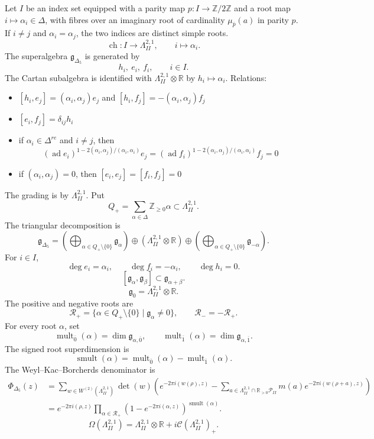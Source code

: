 \documentclass[11pt]{memoir}
\newcommand{\Z}{\mathbb{Z}} \newcommand{\C}{\mathbb{C}}
\newcommand{\R}{\mathbb{R}} \newcommand{\La}{\Lambda}
\newcommand{\Cone}{\mathcal{C}}
\newcommand{\Poly}{\mathcal{P}}
\newcommand{\rootmult}{\operatorname{mult}}
\newcommand{\smult}{\operatorname{smult}}
\newcommand{\autcor}{\mathfrak{g}_{\Delta_5}}
\begin{document}
\begin{definition}
Let $I$ be an index set equipped with a parity map $p:I\to\Z/2\Z$ and a
root map $i\mapsto\alpha_i\in\Delta$, with fibres over an imaginary root
of cardinality $\mu_{\overline p}(a)$ in parity $p$.  If
$i\neq j$ and $\alpha_i=\alpha_j$, the two indices are distinct simple
roots.
$$\operatorname{ch}:I\rightarrow\La^{2,1}_{II},\qquad
i\mapsto\alpha_i.$$
The superalgebra $\autcor$ is generated by
$$h_i,\ e_i,\ f_i,\qquad i\in I.$$
The Cartan subalgebra is identified with $\La^{2,1}_{II}\otimes\R$ by
$h_i\mapsto\alpha_i$.  Relations:

\begin{itemize}
\item $[h_i,e_j]=(\alpha_i,\alpha_j)e_j$ and
$[h_i,f_j]=-(\alpha_i,\alpha_j)f_j$
\item $[e_i,f_j]=\delta_{ij}h_i$
\item if $\alpha_i \in \Delta^{re}$ and $i\neq j$, then
$$
(\operatorname{ad} e_i)^{1-2(\alpha_i,\alpha_j)/(\alpha_i,\alpha_i)}
e_j=
(\operatorname{ad} f_i)^{1-2(\alpha_i,\alpha_j)/(\alpha_i,\alpha_i)}
f_j=0
$$
\item if $(\alpha_i,\alpha_j)=0$, then $[e_i,e_j]=[f_i,f_j]=0$
\end{itemize}
\end{definition}

The grading is by $\La^{2,1}_{II}$.  Put
$$Q_+=\sum_{\alpha\in\Delta}\Z_{\geq0}\alpha
\subset\La^{2,1}_{II}.$$
The triangular decomposition is
$$\autcor =
\left(\bigoplus_{\alpha \in Q_+\setminus\{0\}}
\mathfrak{g}_{\alpha}\right)
\oplus(\La^{2,1}_{II}\otimes\R)
\oplus
\left(\bigoplus_{\alpha \in Q_+\setminus\{0\}}
\mathfrak{g}_{-\alpha}\right).$$
For $i\in I$,
$$\deg e_i=\alpha_i,\qquad \deg f_i=-\alpha_i,\qquad \deg h_i=0.$$
$$[\mathfrak g_\alpha,\mathfrak g_\beta]\subset
\mathfrak g_{\alpha+\beta}.$$
$$\mathfrak{g}_0=\La^{2,1}_{II}\otimes\R.$$
The positive and negative roots are
$$\mathcal R_+=\{\alpha\in Q_+\setminus\{0\}\mid
\mathfrak{g}_{\alpha}\neq0\},\qquad
\mathcal R_-=-\mathcal R_+.$$
For every root $\alpha$, set
$$\rootmult_{\overline{0}}(\alpha)
=\dim\mathfrak{g}_{\alpha,\overline{0}},\qquad
\rootmult_{\overline{1}}(\alpha)
=\dim\mathfrak{g}_{\alpha,\overline{1}}.$$
The signed root superdimension is
$$\smult(\alpha)=\rootmult_{\overline{0}}(\alpha)
-\rootmult_{\overline{1}}(\alpha).$$
The Weyl--Kac--Borcherds denominator is
$$
\begin{aligned}
\Phi_{\Delta_5}(z)
&=\sum_{w\in W^{(2)}(\La^{2,1}_{II})}\det(w)
\left(
e^{-2\pi i(w(\rho),z)}
-\sum_{a\in\La^{2,1}_{II}\cap\R_{>0}\Poly_{II}}
m(a)e^{-2\pi i(w(\rho+a),z)}
\right)\\
&=e^{-2\pi i(\rho,z)}
\prod_{\alpha\in\mathcal R_+}
\left(1-e^{-2\pi i(\alpha,z)}\right)^{\smult(\alpha)}.
\end{aligned}
$$
$$\Omega(\La^{2,1}_{II})
=\La^{2,1}_{II}\otimes\R+i\Cone(\La^{2,1}_{II})_+.$$
\end{document}

